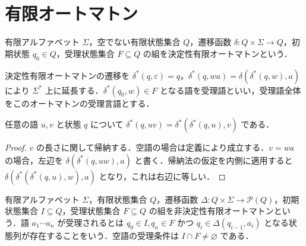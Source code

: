 \section{有限オートマトン}
\begin{defn}[決定性有限オートマトン]
有限アルファベット $\Sigma$，空でない有限状態集合 $Q$，遷移函数 $\delta:Q\times\Sigma\to Q$，初期状態 $q_0\in Q$，受理状態集合 $F\subseteq Q$ の組を決定性有限オートマトンという．
\end{defn}
\begin{defn}[語による遷移と受理]
決定性有限オートマトンの遷移を $\delta^*(q,\varepsilon)=q$，$\delta^*(q,wa)=\delta(\delta^*(q,w),a)$ により $\Sigma^*$ 上に延長する．$\delta^*(q_0,w)\in F$ となる語を受理語といい，受理語全体をこのオートマトンの受理言語とする．
\end{defn}
\begin{prop}[連接に関する遷移]
任意の語 $u,v$ と状態 $q$ について $\delta^*(q,uv)=\delta^*(\delta^*(q,u),v)$ である．
\end{prop}
\begin{proof}
$v$ の長さに関して帰納する．空語の場合は定義により成立する．$v=wa$ の場合，左辺を $\delta(\delta^*(q,uw),a)$ と書く．帰納法の仮定を内側に適用すると $\delta(\delta^*(\delta^*(q,u),w),a)$ となり，これは右辺に等しい．
\end{proof}
\begin{defn}[非決定性有限オートマトン]
有限アルファベット $\Sigma$，有限状態集合 $Q$，遷移函数 $\Delta:Q\times\Sigma\to\mathcal P(Q)$，初期状態集合 $I\subseteq Q$，受理状態集合 $F\subseteq Q$ の組を非決定性有限オートマトンという．語 $a_1\cdots a_n$ が受理されるとは $q_0\in I,q_n\in F$ かつ $q_i\in\Delta(q_{i-1},a_i)$ となる状態列が存在することをいう．空語の受理条件は $I\cap F\ne\varnothing$ である．
\end{defn}
